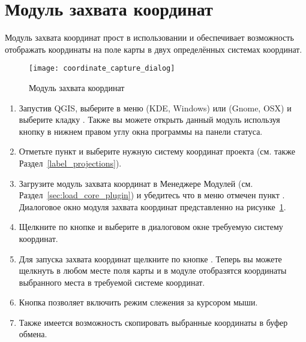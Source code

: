 
\section{Модуль захвата координат}


Модуль захвата координат прост в использовании и обеспечивает возможность
отображать координаты на поле карты в двух определённых системах координат.

\begin{figure}[ht]
   \centering
   \texttt{[image: coordinate\_capture\_dialog]}
   \caption{Модуль захвата координат \wincaption}\label{fig:coordinate_capture_dialog}
\end{figure}

\begin{enumerate}
  \item Запустив QGIS, выберите  в меню
   (KDE, Windows) или  (Gnome, OSX)
  и выберите кладку . Также вы можете открыть данный модуль
  используя кнопку 
  в нижнем правом углу окна программы на панели статуса.
  \item Отметьте пункт 
  и выберите нужную систему координат проекта (см. также Раздел~\ref{label_projections}).
  \item Загрузите модуль захвата координат в Менеджере Модулей (см. Раздел~\ref{sec:load_core_plugin})
  и убедитесь что в меню  \arrow {}
  отмечен пункт .
  Диалоговое окно модуля захвата координат представленно на
  рисунке~\ref{fig:coordinate_capture_dialog}.
  \item Щелкните по кнопке  и выберите в диалоговом окне
  требуемую систему координат.
  \item Для запуска захвата координат щелкните по кнопке .
  Теперь вы можете щелкнуть в любом месте поля карты и в модуле отобразятся
  координаты выбранного места в требуемой системе координат.
  \item Кнопка  позволяет включить
  режим слежения за курсором мыши.
  \item Также имеется возможность скопировать выбранные координаты в буфер обмена.
\end{enumerate}

\FloatBarrier
